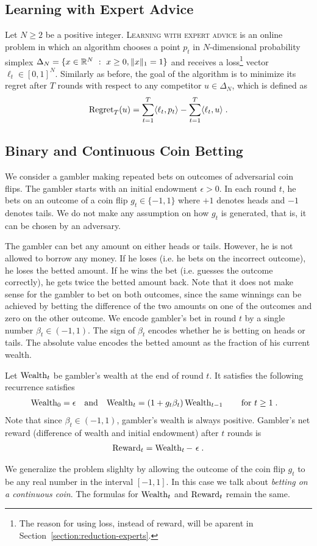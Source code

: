 \subsection{Learning with Expert Advice}

Let $N \ge 2$ be a positive integer. \textsc{Learning with expert advice} is an
online problem in which an algorithm chooses a point $p_t$ in $N$-dimensional
probability simplex $\Delta_N = \{ x \in \mathbb{R}^N ~:~ x \ge 0, \|x\|_1 = 1 \}$ and
receives a loss\footnote{The reason for using loss, instead of reward, will be
aparent in Section~\ref{section:reduction-experts}.} vector $\ell_t \in
[0,1]^N$. Similarly as before, the goal of the algorithm is to minimize its
regret after $T$ rounds with respect to any competitor $u \in \Delta_N$, which
is defined as
$$
\operatorname{Regret}_T(u) = \sum_{t=1}^T \langle \ell_t, p_t \rangle - \sum_{t=1}^T \langle \ell_t, u \rangle \; .
$$

\subsection{Binary and Continuous Coin Betting}

We consider a gambler making repeated bets on outcomes of adversarial coin
flips. The gambler starts with an initial endowment $\epsilon > 0$. In each
round $t$, he bets on an outcome of a coin flip $g_t \in \{-1,1\}$ where $+1$
denotes heads and $-1$ denotes tails. We do not make any assumption on how $g_t$
is generated, that is, it can be chosen by an adversary.

The gambler can bet any amount on either heads or tails. However, he is not
allowed to borrow any money. If he loses (i.e. he bets on the incorrect
outcome), he loses the betted amount. If he wins the bet (i.e. guesses the
outcome correctly), he gets twice the betted amount back.  Note that it does not
make sense for the gambler to bet on both outcomes, since the same winnings can
be achieved by betting the difference of the two amounts on one of the outcomes
and zero on the other outcome. We encode gambler's bet in round $t$ by a single
number $\beta_t \in (-1,1)$. The sign of $\beta_t$ encodes whether he is betting
on heads or tails. The absolute value encodes the betted amount as the fraction
of his current wealth.

Let $\operatorname{Wealth}_t$ be gambler's wealth at the end of round $t$. It satisfies the
following recurrence satisfies
\begin{align}
\label{equation:wealth-recurrence}
\operatorname{Wealth}_0 & = \epsilon &
& \text{and} &
\operatorname{Wealth}_t & = (1 + g_t \beta_t) \operatorname{Wealth}_{t-1} \qquad \text{for $t \ge 1$} \; .
\end{align}
Note that since $\beta_t \in (-1,1)$, gambler's wealth is always positive.
Gambler's net reward (difference of wealth and initial endowment) after $t$
rounds is
\begin{align}
\label{equation:reward-wealth}
\operatorname{Reward}_t = \operatorname{Wealth}_t - \ \epsilon \; .
\end{align}

We generalize the problem slighlty by allowing the outcome of the coin flip
$g_t$ to be any real number in the interval $[-1,1]$. In this case we talk about
\emph{betting on a continuous coin}. The formulas for $\operatorname{Wealth}_t$ and
$\operatorname{Reward}_t$ remain the same.
